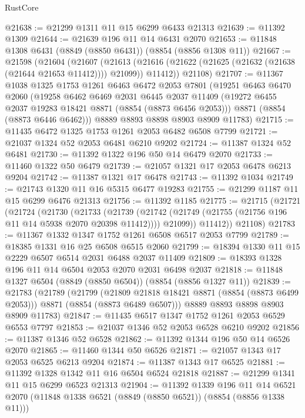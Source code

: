 \begin{lexlean}{RustCore}
\begin{coremodule}
@21638 := @21299 @1311 @11 @15 @6299 @6433 @21313
@21639 := @11392 @1309
@21644 := @21639 @196 @11 @14 @6431 @2070
@21653 := @11848 @1308 @6431 (@8849 (@8850 @6431)) (@8854 (@8856 @1308 @11))
@21667 := @21598
    (@21604
      (@21607
        (@21613 (@21616 (@21622 (@21625 (@21632 (@21638 (@21644 @21653 @11412)))) @21099)) @11412))
      @21108)
@21707 := @11367
    @1038
    @1325
    @1753
    @1261
    @6463
    @6472
    @2053
    @7801
    (@19251
      @6463
      @6470
      @2060
      (@19258
        @6462
        @6469
        @2031
        @6445
        @2037
        @11409
        (@19272 @6455 @2037 @19283 @18421 @8871 (@8854 (@8873 @6456 @2053)))
        @8871
        (@8854 (@8873 @6446 @6462)))
      @8889
      @8893
      @8898
      @8903
      @8909
      @11783)
@21715 := @11435 @6472 @1325 @1753 @1261 @2053 @6482 @6508 @7799
@21721 := @21037 @1324 @52 @2053 @6481 @6210 @9202
@21724 := @11387 @1324 @52 @6481
@21730 := @11392 @1322 @196 @50 @14 @6479 @2070
@21733 := @11460 @1322 @50 @6479
@21739 := @21057 @1321 @17 @2053 @6478 @6213 @9204
@21742 := @11387 @1321 @17 @6478
@21743 := @11392 @1034
@21749 := @21743 @1320 @11 @16 @5315 @6477 @19283
@21755 := @21299 @1187 @11 @15 @6299 @6476 @21313
@21756 := @11392 @1185
@21775 := @21715
    (@21721
      (@21724
        (@21730
          (@21733
            (@21739
              (@21742 (@21749 (@21755 (@21756 @196 @11 @14 @5938 @2070 @20398 @11412))))
              @21099))
          @11412))
      @21108)
@21783 := @11367 @1332 @1347 @1752 @1261 @6508 @6517 @2053 @7799
@21789 := @18385 @1331 @16 @25 @6508 @6515 @2060
@21799 := @18394 @1330 @11 @15 @2229 @6507 @6514 @2031 @6488 @2037 @11409
@21809 := @18393 @1328 @196 @11 @14 @6504 @2053 @2070 @2031 @6498 @2037
@21818 := @11848 @1327 @6504 (@8849 (@8850 @6504)) (@8854 (@8856 @1327 @11))
@21839 := @21783
    (@21789
      (@21799
        (@21809 @21818 @18421 @8871 (@8854 (@8873 @6499 @2053)))
        @8871
        (@8854 (@8873 @6489 @6507)))
      @8889
      @8893
      @8898
      @8903
      @8909
      @11783)
@21847 := @11435 @6517 @1347 @1752 @1261 @2053 @6529 @6553 @7797
@21853 := @21037 @1346 @52 @2053 @6528 @6210 @9202
@21856 := @11387 @1346 @52 @6528
@21862 := @11392 @1344 @196 @50 @14 @6526 @2070
@21865 := @11460 @1344 @50 @6526
@21871 := @21057 @1343 @17 @2053 @6525 @6213 @9204
@21874 := @11387 @1343 @17 @6525
@21881 := @11392 @1328 @1342 @11 @16 @6504 @6524 @21818
@21887 := @21299 @1341 @11 @15 @6299 @6523 @21313
@21904 := @11392
    @1339
    @196
    @11
    @14
    @6521
    @2070
    (@11848 @1338 @6521 (@8849 (@8850 @6521)) (@8854 (@8856 @1338 @11)))

\end{coremodule}
\end{lexlean}
